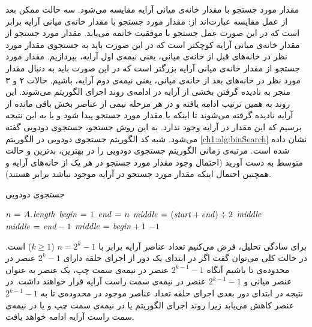 {مقدار مورد جستجو با مقدار خانه‌ی میانی آرایه مقایسه می‌شود. سه حالت ممکن بعد از عمل مقایسه عبارت‌اند از:
 مقدار مورد جستجو با مقدار خانه‌ی میانی آرایه برابر است که در این صورت عمل جستجو با موفقیت خاتمه می‌یابد.
 مقدار مورد جستجو از مقدار خانه‌ی میانی آرایه کوچکتر است که در این صورت باید به جستجوی مقدار مورد نظر در خانه‌های قبل از خانه‌ی میانی، یعنی نیمه‌ی اول آرایه، بپردازیم.
 مقدار مورد جستجو از مقدار خانه‌ی میانی آرایه بزرگتر است که در این صورت باید به دنبال مقدار مورد نظر در خانه‌های بعد از خانه‌ی میانی، یعنی نیمه‌ی دوم آرایه، باشیم. 
حالات ۲ و ۳ منجر به نادیده گرفتن بخشی از آرایه در ادامه‌ی روند اجرای الگوریتم می‌شوند. این روند به همین ترتیب ادامه یافته و در هر مرحله نیمی از عناصر بخش باقی مانده از آرایه نادیده گرفته می‌شوند تا اینکه یا مقدار مورد جستجو پیدا شود و یا به این نتیجه برسیم که این مقدار در آرایه وجود ندارد. به این روش جستجو، جستجوی دودویی گفته می‌شود. شبه کد الگوریتم جستجوی دودویی در الگوریتم {\eqref{ch1:alg:binSearch}} نشان داده شده است. مرتبه‌ی زمانی الگوریتم جستجوی دودویی را در بهترین، بدترین و حالت متوسط به دست آورید (احتمال وجود مقدار مورد جستجو در هر یک از خانه‌های آرایه و همچنین احتمال اینکه مقدار مورد جستجو در آرایه موجود نباشد برابر هستند).

\begin{algorithm}
\caption{جستجوی دودویی}\label{ch1:alg:binSearch}
\begin{latin}
\begin{algorithmic}[1]
		\State	$n \mathrel{\hspace{1pt}=\hspace{1pt}} A.\hspace*{1pt}\mathit{length}$
		\State	$\mathit{begin} \mathrel{\hspace{1pt}=\hspace{1pt}} 1$
		\State	$\mathit{end} \mathrel{\hspace{1pt}=\hspace{1pt}} n$
				\State	$ \mathit{middle} \mathrel{\hspace{1pt}=\hspace{1pt}} (\mathit{start}+\mathit{end}) \div 2 $
						\State	\Return $\mathit{middle}$
						\State	$\mathit{middle} \mathrel{\hspace{1pt}=\hspace{1pt}} \mathit{end} - 1$
				\Else	
					 	\State	$\mathit{middle} \mathrel{\hspace{1pt}=\hspace{1pt}} \mathit{begin} + 1$	
				\EndIf
		\EndWhile
		\State	\Return	$-1$
\EndFunction
\end{algorithmic}
\end{latin}
\end{algorithm}


برای سادگی تحلیل، فرض می‌کنیم تعداد عناصر آرایه برابر با {$n=2^{k}-1$} ({$k\geqslant 1$}) است. در حالت کلی می‌توان گفت اگر در ابتدای یک دور از اجرای حلقه دارای {$2^{k}-1$} عنصر در محدوده‌ی {} تا {} باشیم آنگاه {$2^{k-1}-1$} عنصر در نیمه‌ی سمت چپ، یک عنصر به عنوان عنصر میانی و {$2^{k-1}-1$} عنصر در نیمه‌ی سمت راست آرایه قرار خواهند داشت. در نتیجه در ابتدای دور بعدی اجرای حلقه تعداد عناصر موجود در محدوده‌ی {} تا {} به {$2^{k-1}-1$} عنصر کاهش می‌یابد زیرا روند اجرای الگوریتم یا در نیمه‌ی سمت چپ و یا در نیمه‌ی سمت راست آرایه ادامه خواهد یافت.

}
